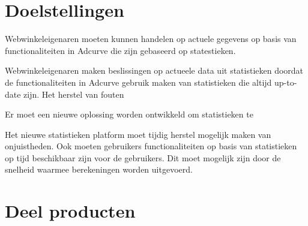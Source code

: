 \section{Doelstellingen} %

Webwinkeleigenaren moeten kunnen handelen op actuele gegevens op basis van functionaliteiten in Adcurve die zijn gebaseerd op statestieken.

Webwinkeleigenaren maken beslissingen op actueele data uit statistieken doordat de functionaliteiten in Adcurve gebruik maken van statistieken die altijd up-to-date zijn.
Het herstel van fouten


Er moet een nieuwe oplossing worden ontwikkeld om statistieken te

Het nieuwe statistieken platform moet tijdig herstel mogelijk maken van onjuistheden. Ook moeten gebruikers functionaliteiten op basis van statistieken op tijd beschikbaar zijn voor de gebruikers. Dit moet mogelijk zijn door de snelheid waarmee berekeningen worden uitgevoerd.



\section{Deel producten}




